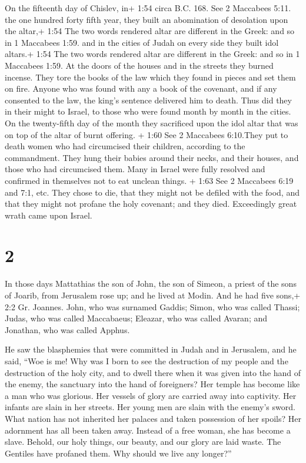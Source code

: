  On the fifteenth day of Chislev, in+ 1:54 circa B.C. 168.
See 2 Maccabees 5:11. the one hundred forty fifth year, they built an
abomination of desolation upon the altar,+ 1:54 The two words rendered
altar are different in the Greek: and so in 1 Maccabees 1:59. and in the
cities of Judah on every side they built idol altars.+ 1:54 The two
words rendered altar are different in the Greek: and so in 1 Maccabees
1:59.  At the doors of the houses and in the streets they
burned incense.  They tore the books of the law which they
found in pieces and set them on fire.  Anyone who was found
with any a book of the covenant, and if any consented to the law, the
king's sentence delivered him to death.  Thus did they in
their might to Israel, to those who were found month by month in the
cities.  On the twenty-fifth day of the month they
sacrificed upon the idol altar that was on top of the altar of burnt
offering.  + 1:60 See 2 Maccabees 6:10.They put to death
women who had circumcised their children, according to the commandment.
 They hung their babies around their necks, and their
houses, and those who had circumcised them.  Many in Israel
were fully resolved and confirmed in themselves not to eat unclean
things.  + 1:63 See 2 Maccabees 6:19 and 7:1, etc. They
chose to die, that they might not be defiled with the food, and that
they might not profane the holy covenant; and they died. 
Exceedingly great wrath came upon Israel.

\hypertarget{section-1}{%
\section{2}\label{section-1}}

 In those days Mattathias the son of John, the son of
Simeon, a priest of the sons of Joarib, from Jerusalem rose up; and he
lived at Modin.  And he had five sons,+ 2:2 Gr. Joannes.
John, who was surnamed Gaddis;  Simon, who was called
Thassi;  Judas, who was called Maccabaeus; 
Eleazar, who was called Avaran; and Jonathan, who was called Apphus.

 He saw the blasphemies that were committed in Judah and in
Jerusalem,  and he said, ``Woe is me! Why was I born to see
the destruction of my people and the destruction of the holy city, and
to dwell there when it was given into the hand of the enemy, the
sanctuary into the hand of foreigners?  Her temple has
become like a man who was glorious.  Her vessels of glory
are carried away into captivity. Her infants are slain in her streets.
Her young men are slain with the enemy's sword.  What
nation has not inherited her palaces and taken possession of her spoils?
 Her adornment has all been taken away. Instead of a free
woman, she has become a slave.  Behold, our holy things,
our beauty, and our glory are laid waste. The Gentiles have profaned
them.  Why should we live any longer?''


